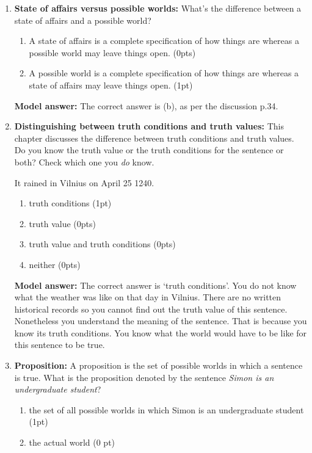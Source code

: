 \documentclass[a4,11pt]{article}
\begin{document}
\begin{enumerate}[leftmargin = 12pt]
  \item {\bf State of affairs versus possible worlds:} What's the difference between a state of affairs and a possible world?

      \begin{enumerate}[noitemsep]
        \item A state of affairs is a complete specification of how things are whereas a possible world may leave things open. (0pts)
	\item A possible world is a complete specification of how things are whereas a state of affairs may leave things open. (1pt)
         \end{enumerate}
         
 {\bf Model answer:} The correct answer is (b), as per the discussion p.34.
          
      \item { \bf Distinguishing between truth conditions and truth values:} This chapter discusses the difference between truth conditions and truth values. Do you know the truth value or the truth conditions for the sentence or both? Check which one you \textit{do} know.

\begin{exe}
\ex It rained in Vilnius on April 25 1240.
\end{exe}

       \begin{enumerate}[noitemsep]
       \item truth conditions (1pt)
        \item truth value (0pts)
        \item truth value and truth conditions (0pts)
        \item neither (0pts)
         \end{enumerate}

{\bf Model answer:} The correct answer is `truth conditions'. You do not know what the weather was like on that day in Vilnius. There are no written historical records so you cannot find out the truth value of this sentence. Nonetheless you understand the meaning of the sentence. That is because you know its truth conditions. You know what the world would have to be like for this sentence to be true.  


   \item {\bf Proposition:}  A proposition is the set of possible worlds in which a sentence is true.  What is the proposition denoted by the sentence \textit{Simon is an undergraduate student}?
       \begin{enumerate}[noitemsep]
       \item the set of all possible worlds in which Simon is an undergraduate student (1pt)
        \item the actual world (0 pt)
    \end{enumerate}     
    

\end{enumerate}
\end{document}
